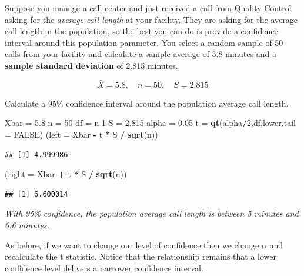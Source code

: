 \documentclass[
]{book}
\newenvironment{Shaded}{\begin{snugshade}}{\end{snugshade}}
\newcommand{\AttributeTok}[1]{\textcolor[rgb]{0.13,0.29,0.53}{#1}}
\newcommand{\ConstantTok}[1]{\textcolor[rgb]{0.56,0.35,0.01}{#1}}
\newcommand{\DecValTok}[1]{\textcolor[rgb]{0.00,0.00,0.81}{#1}}
\newcommand{\FloatTok}[1]{\textcolor[rgb]{0.00,0.00,0.81}{#1}}
\newcommand{\FunctionTok}[1]{\textcolor[rgb]{0.13,0.29,0.53}{\textbf{#1}}}
\newcommand{\NormalTok}[1]{#1}
\newcommand{\OtherTok}[1]{\textcolor[rgb]{0.56,0.35,0.01}{#1}}
\newcommand{\SpecialCharTok}[1]{\textcolor[rgb]{0.81,0.36,0.00}{\textbf{#1}}}
\begin{document}
Suppose you manage a call center and just received a call from Quality Control asking for the \emph{average call length} at your facility. They are asking for the average call length in the population, so the best you can do is provide a confidence interval around this population parameter. You select a random sample of 50 calls from your facility and calculate a sample average of 5.8 minutes and a \textbf{sample standard deviation} of 2.815 minutes.

\[\bar{X}=5.8, \quad n=50, \quad S=2.815\]

Calculate a 95\% confidence interval around the population average call length.

\begin{Shaded}
\begin{Highlighting}[]
\NormalTok{Xbar }\OtherTok{=} \FloatTok{5.8}
\NormalTok{n }\OtherTok{=} \DecValTok{50}
\NormalTok{df }\OtherTok{=}\NormalTok{ n}\DecValTok{{-}1}
\NormalTok{S }\OtherTok{=} \FloatTok{2.815}
\NormalTok{alpha }\OtherTok{=} \FloatTok{0.05}
\NormalTok{t }\OtherTok{=} \FunctionTok{qt}\NormalTok{(alpha}\SpecialCharTok{/}\DecValTok{2}\NormalTok{,df,}\AttributeTok{lower.tail =} \ConstantTok{FALSE}\NormalTok{)}
\NormalTok{(}\AttributeTok{left =}\NormalTok{ Xbar }\SpecialCharTok{{-}}\NormalTok{ t }\SpecialCharTok{*}\NormalTok{ S }\SpecialCharTok{/} \FunctionTok{sqrt}\NormalTok{(n))}
\end{Highlighting}
\end{Shaded}

\begin{verbatim}
## [1] 4.999986
\end{verbatim}

\begin{Shaded}
\begin{Highlighting}[]
\NormalTok{(}\AttributeTok{right =}\NormalTok{ Xbar }\SpecialCharTok{+}\NormalTok{ t }\SpecialCharTok{*}\NormalTok{ S }\SpecialCharTok{/} \FunctionTok{sqrt}\NormalTok{(n))}
\end{Highlighting}
\end{Shaded}

\begin{verbatim}
## [1] 6.600014
\end{verbatim}

\emph{With 95\% confidence, the population average call length is between 5 minutes and 6.6 minutes.}

As before, if we want to change our level of confidence then we change \(\alpha\) and recalculate the t statistic. Notice that the relationship remains that a lower confidence level delivers a narrower confidence interval.
\end{document}
